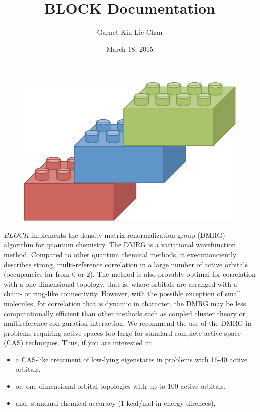 \documentclass[letterpaper,10pt,english]{sphinxmanual}
\title{BLOCK Documentation}
\date{March 18, 2015}
\author{Garnet Kin-Lic Chan}
\begin{document}
\maketitle
\tableofcontents
{}\label{index::doc}

\begin{figure}[htbp]\begin{flushleft}

\includegraphics{block_logo.jpg}
\end{flushleft}\end{figure}

\emph{BLOCK} implements the density matrix renormalization group (DMRG) algorithm for quantum chemistry.
The DMRG is a variational wavefunction method. Compared to other quantum chemical methods,
it executionciently describes strong, multi-reference correlation in a large number of active orbitals (occupancies far from 0 or 2).
The method is also provably optimal for correlation with a one-dimensional topology, that is,
where orbitals are arranged with a chain- or ring-like connectivity.
However, with the possible exception of small molecules, for correlation that is dynamic in character,
the DMRG may be less computationally efficient than other methods
such as coupled cluster theory or multireference con guration interaction.
We recommend the use of the DMRG in problems requiring active spaces too large for
standard complete active space (CAS) techniques. Thus, if you are interested in:
\begin{itemize}
\item {} 
a CAS-like treatment of low-lying eigenstates in problems with 16-40 active orbitals,

\item {} 
or, one-dimensional orbital topologies with up to 100 active orbitals,

\item {} 
and, standard chemical accuracy (1 kcal/mol in energy dirences),

\end{itemize}
\end{document}
